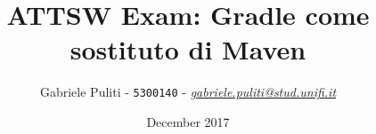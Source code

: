 \documentclass{article}
\title{ATTSW Exam: Gradle come sostituto di Maven}
\author{Gabriele Puliti - \texttt{5300140} - \href{mailto:gabriele.puliti@stud.unifi.it}{\textit{gabriele.puliti@stud.unifi.it}}}
\date{December 2017}
\begin{document}
\maketitle

\newpage
\tableofcontents
\newpage

\begin{flushleft}


\newpage


\end{flushleft}
\end{document}
